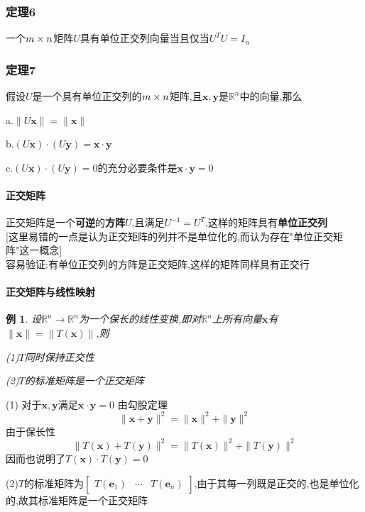 \documentclass{article}
\newtheorem{example}{例}[subsection]
\newenvironment{cproof}{%
\heiti{证明}\kaishu
}{%
}
\newcommand{\RR}{\mathbb{R}}
\newcommand{\ve}{\boldsymbol}
\begin{document}
\begin{CJK}{UTF8}{gkai}
\subsubsection{定理6}
一个$m\times n$矩阵$U$具有单位正交列向量当且仅当$U^T U = I_n$
\subsubsection{定理7}
假设$U$是一个具有单位正交列的$m\times n$矩阵,且$\ve{x},\ve{y}$是$\RR^n$中的向量,那么

a.$\|U \ve{x}\| = \|\ve{x}\|$

b.$(U\ve{x})\cdot(U\ve{y}) = \ve{x} \cdot \ve{y}$

c.$(U\ve{x})\cdot(U\ve{y}) = 0$的充分必要条件是$\ve{x} \cdot \ve{y} = 0$
\paragraph{正交矩阵}
正交矩阵是一个\textbf{可逆}的\textbf{方阵}$U$,且满足$U^{-1} = U^T$,这样的矩阵具有\textbf{单位正交列}\\

[这里易错的一点是认为正交矩阵的列并不是单位化的,而认为存在"单位正交矩阵"这一概念]\\

容易验证:有单位正交列的方阵是正交矩阵,这样的矩阵同样具有正交行\\

\paragraph{正交矩阵与线性映射}
\begin{example}
    设$\RR^n \to \RR^n$为一个保长的线性变换,即对$\RR^n$上所有向量$\ve{x}$有$\|\ve{x}\| = \|T(\ve{x})\|$,则

    (1)$T$同时保持正交性

    (2)$T$的标准矩阵是一个正交矩阵

\end{example}

\begin{cproof}
   (1) 对于$\ve{x},\ve{y}$满足$\ve{x}\cdot \ve{y} = 0$
    由勾股定理
    \[\|\ve{x} + \ve{y}\|^2 = \|\ve{x}\|^2 + \|\ve{y}\|^2 \]
    由于保长性
    \[\|T(\ve{x}) + T(\ve{y})\|^2 = \|T(\ve{x})\|^2 + \|T(\ve{y})\|^2 \]
    因而也说明了$T(\ve{x})\cdot T(\ve{y}) = 0$

    (2)$T$的标准矩阵为$\begin{bmatrix}
        T(\ve{e}_1)&\cdots&T(\ve{e}_n)
    \end{bmatrix}$,由于其每一列既是正交的,也是单位化的,故其标准矩阵是一个正交矩阵
\end{cproof}


\end{CJK}
\end{document}
